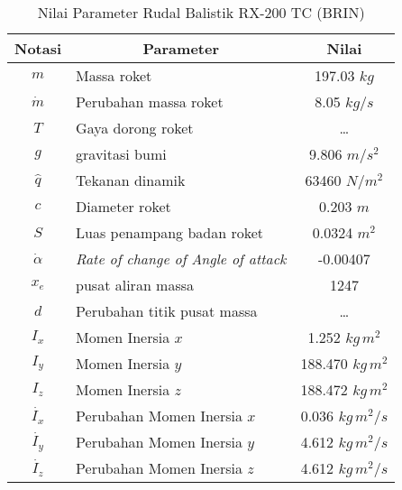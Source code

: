 
\begin{table}[htbp]
 \setlength{\tabcolsep}{10pt}
    \centering
    \caption{Nilai Parameter Rudal Balistik RX-200 TC (BRIN)}
    \begin{tabular}{|c|l|c|}
    \hline 
        \textbf{Notasi} & \multicolumn{1}{c|}{\textbf{Parameter}}  & \textbf{Nilai} \\
        \hline
        $m$ & Massa roket & 197.03 $kg$\\
        \hline
        $\dot{m}$ & Perubahan massa roket & 8.05 $kg/s$ \\
        \hline
        $T$ & Gaya dorong roket & \dots  \\
        \hline
        $g$ & gravitasi bumi & 9.806 $m/s^2$ \\
        \hline
        $\hat{q}$ & Tekanan dinamik & 63460 $N/m^2$ \\
        \hline
        $c$ & Diameter roket & 0.203 $m$ \\
        \hline
        $S$ & Luas penampang badan roket & 0.0324 $m^2$ \\
        \hline
        $\dot{\alpha}$ & \textit{Rate of change of Angle of attack} & -0.00407 \\
        \hline
        $x_e$ & pusat aliran massa & 1247 \\
        \hline 
        $d$ & Perubahan titik pusat massa & \dots \\
        \hline
        $I_x$ & Momen Inersia $x$ & 1.252 $kg\,m^2$ \\
        \hline
        $I_y$ & Momen Inersia $y$ & 188.470 $kg\,m^2$ \\
        \hline
        $I_z$ & Momen Inersia $z$ & 188.472  $kg\,m^2$ \\
        \hline
        $\dot{I_x}$ & Perubahan Momen Inersia $x$ & 0.036  $kg\,m^2/s$ \\
        \hline
        $\dot{I_y}$ & Perubahan Momen Inersia $y$ & 4.612  $kg\,m^2/s$ \\
        \hline
        $\dot{I_z}$ & Perubahan Momen Inersia $z$ & 4.612 $kg\,m^2/s$ \\
        \hline
    \end{tabular}
    \label{tab: parameter rudal}
\end{table}


